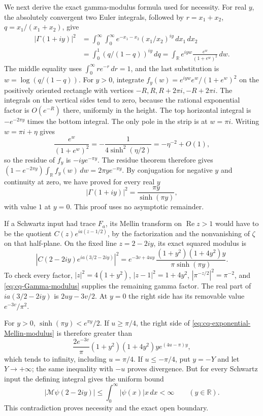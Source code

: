 We next derive the exact gamma-modulus formula used for necessity.
For real $y$, the absolutely convergent two Euler integrals,
followed by $r=x_1+x_2$, $q=x_1/(x_1+x_2)$, give
\[
 \begin{aligned}
 |\Gamma(1+iy)|^2
 &=\int_0^\infty\!\!\int_0^\infty
       e^{-x_1-x_2}(x_1/x_2)^{iy}\,dx_1\,dx_2\\
 &=\int_0^1(q/(1-q))^{iy}\,dq
 =\int_{\mathbb R}e^{iyw}\frac{e^w}{(1+e^w)^2}\,dw .
 \end{aligned}
\]
The middle equality uses $\int_0^\infty r e^{-r}\,dr=1$,
and the last substitution is $w=\log(q/(1-q))$.
For $y>0$, integrate
$f_y(w)=e^{iyw}e^w/(1+e^w)^2$ on the positively oriented
rectangle with vertices $-R,R,R+2\pi i,-R+2\pi i$.
The integrals on the vertical sides tend to zero, because the
rational exponential factor is $O(e^{-R})$ there, uniformly
in the height. The top horizontal integral is
$-e^{-2\pi y}$ times the bottom integral. The only pole in
the strip is at $w=\pi i$. Writing $w=\pi i+\eta$ gives
\[
 \frac{e^w}{(1+e^w)^2}
 =-\frac{1}{4\sinh^2(\eta/2)}
 =-\eta^{-2}+O(1),
\]
so the residue of $f_y$ is $-iy e^{-\pi y}$. The residue
theorem therefore gives
$(1-e^{-2\pi y})\int_{\mathbb R}f_y(w)\,dw
=2\pi y e^{-\pi y}$. By conjugation for negative $y$ and
continuity at zero, we have proved for every real $y$
\begin{equation}\label{eq:cq-Gamma-modulus}
 |\Gamma(1+iy)|^2=\frac{\pi y}{\sinh(\pi y)},
\end{equation}
with value $1$ at $y=0$. This proof uses no asymptotic remainder.

If a Schwartz input had trace $F_a$, its Mellin transform on
$\operatorname{Re}z>1$ would have to be the quotient
$C(z)e^{ia(z-1/2)}$, by the factorization and the nonvanishing
of $\zeta$ on that half-plane. On the fixed line $z=2-2iy$,
its exact squared modulus is
\begin{equation}\label{eq:cq-exponential-Mellin-modulus}
 \left|C(2-2iy)e^{ia(3/2-2iy)}\right|^2
 = e^{-3v+4uy}\,
       \frac{(1+y^2)(1+4y^2)y}{\pi\sinh(\pi y)}.
\end{equation}
To check every factor, $|z|^2=4(1+y^2)$,
$|z-1|^2=1+4y^2$, $|\pi^{-z/2}|^2=\pi^{-2}$,
and \eqref{eq:cq-Gamma-modulus} supplies the remaining gamma
factor. The real part of $ia(3/2-2iy)$ is $2uy-3v/2$.
At $y=0$ the right side has its removable value $e^{-3v}/\pi^2$.

For $y>0$, $\sinh(\pi y)<e^{\pi y}/2$.
If $u\geq\pi/4$, the right side of
\eqref{eq:cq-exponential-Mellin-modulus} is therefore greater
than
\[
 \frac{2e^{-3v}}{\pi}(1+y^2)(1+4y^2)y
                   e^{(4u-\pi)y},
\]
which tends to infinity, including $u=\pi/4$. If
$u\leq-\pi/4$, put $y=-Y$ and let $Y\to+\infty$; the
same inequality with $-u$ proves divergence. But for every
Schwartz input the defining integral gives the uniform bound
\[
 |\mathcal M\psi(2-2iy)|
 \leq\int_0^\infty|\psi(x)|x\,dx<\infty
 \qquad(y\in\mathbb R).
\]
This contradiction proves necessity and the exact open boundary.

